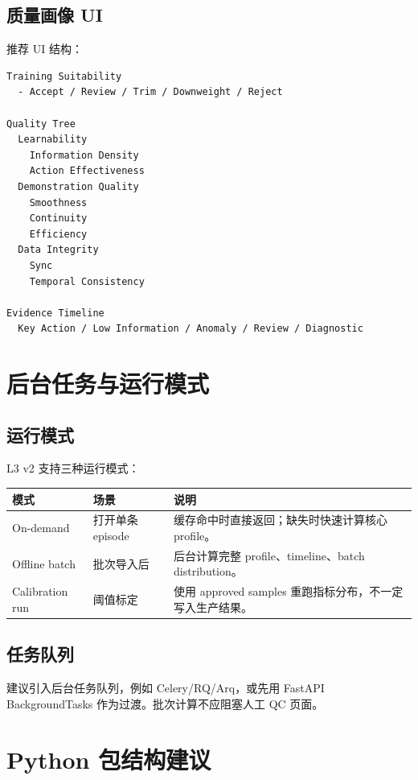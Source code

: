 \documentclass[UTF8,zihao=-4,oneside,openany]{ctexrep}
\begin{document}
\subsection{质量画像 UI}

推荐 UI 结构：

\begin{verbatim}
Training Suitability
  - Accept / Review / Trim / Downweight / Reject

Quality Tree
  Learnability
    Information Density
    Action Effectiveness
  Demonstration Quality
    Smoothness
    Continuity
    Efficiency
  Data Integrity
    Sync
    Temporal Consistency

Evidence Timeline
  Key Action / Low Information / Anomaly / Review / Diagnostic
\end{verbatim}

\section{后台任务与运行模式}

\subsection{运行模式}

L3 v2 支持三种运行模式：

\begin{longtable}{L{3cm} L{4cm} L{6.5cm}}
\toprule
模式 & 场景 & 说明 \\
\midrule
On-demand & 打开单条 episode & 缓存命中时直接返回；缺失时快速计算核心 profile。 \\
Offline batch & 批次导入后 & 后台计算完整 profile、timeline、batch distribution。 \\
Calibration run & 阈值标定 & 使用 approved samples 重跑指标分布，不一定写入生产结果。 \\
\bottomrule
\end{longtable}

\subsection{任务队列}

建议引入后台任务队列，例如 Celery/RQ/Arq，或先用 FastAPI BackgroundTasks 作为过渡。批次计算不应阻塞人工 QC 页面。

\section{Python 包结构建议}
\end{document}
